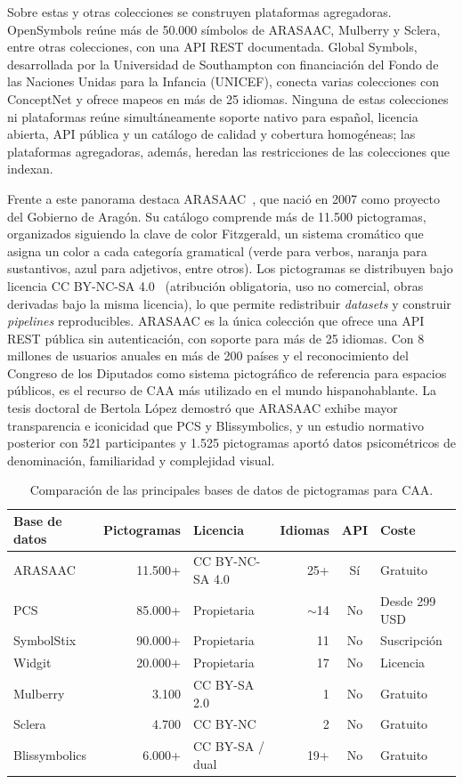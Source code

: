 Sobre estas y otras colecciones se construyen plataformas agregadoras. OpenSymbols reúne más de 50.000 símbolos de ARASAAC, Mulberry y Sclera, entre otras colecciones, con una API REST documentada. Global Symbols, desarrollada por la Universidad de Southampton con financiación del Fondo de las Naciones Unidas para la Infancia (UNICEF), conecta varias colecciones con ConceptNet y ofrece mapeos en más de 25 idiomas. Ninguna de estas colecciones ni plataformas reúne simultáneamente soporte nativo para español, licencia abierta, API pública y un catálogo de calidad y cobertura homogéneas; las plataformas agregadoras, además, heredan las restricciones de las colecciones que indexan.

Frente a este panorama destaca ARASAAC~\cite{arasaac}, que nació en 2007 como proyecto del Gobierno de Aragón. Su catálogo comprende más de 11.500 pictogramas, organizados siguiendo la clave de color Fitzgerald, un sistema cromático que asigna un color a cada categoría gramatical (verde para verbos, naranja para sustantivos, azul para adjetivos, entre otros). Los pictogramas se distribuyen bajo licencia CC BY-NC-SA 4.0~\cite{ccbyncsa4} (atribución obligatoria, uso no comercial, obras derivadas bajo la misma licencia), lo que permite redistribuir \textit{datasets} y construir \textit{pipelines} reproducibles. ARASAAC es la única colección que ofrece una API REST pública sin autenticación, con soporte para más de 25 idiomas. Con 8 millones de usuarios anuales en más de 200 países y el reconocimiento del Congreso de los Diputados como sistema pictográfico de referencia para espacios públicos, es el recurso de CAA más utilizado en el mundo hispanohablante. La tesis doctoral de Bertola López demostró que ARASAAC exhibe mayor transparencia e iconicidad que PCS y Blissymbolics, y un estudio normativo posterior con 521 participantes y 1.525 pictogramas aportó datos psicométricos de denominación, familiaridad y complejidad visual.

\begin{table}[H]
\centering
\small
\begin{tabular}{l r l r c l}
\hline
Base de datos & Pictogramas & Licencia & Idiomas & API & Coste \\
\hline
ARASAAC & 11.500+ & CC BY-NC-SA 4.0 & 25+ & Sí & Gratuito \\
PCS & 85.000+ & Propietaria & $\sim$14 & No & Desde 299 USD \\
SymbolStix & 90.000+ & Propietaria & 11 & No & Suscripción \\
Widgit & 20.000+ & Propietaria & 17 & No & Licencia \\
Mulberry & 3.100 & CC BY-SA 2.0 & 1 & No & Gratuito \\
Sclera & 4.700 & CC BY-NC & 2 & No & Gratuito \\
Blissymbolics & 6.000+ & CC BY-SA / dual & 19+ & No & Gratuito \\
\hline
\end{tabular}
\vspace{0.3em}
\caption{Comparación de las principales bases de datos de pictogramas para CAA.}
\label{tab:pictogram-databases}
\end{table}


